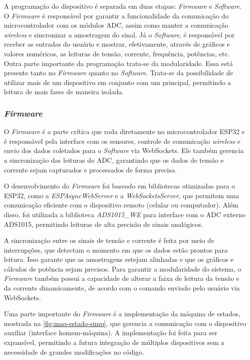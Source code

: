 A programação do dispositivo é separada em duas etapas: \textit{Firmware} e \textit{Software}. O \textit{Firmware} é responsável por garantir a funcionalidade da comunicação do microcontrolador com os módulos \gls{ADC}, assim como manter a comunicação \textit{wireless} e sincronizar a amostragem do sinal.
Já o \textit{Software}, é responsável por receber as entradas do usuário e mostrar, efetivamente, através de gráficos e valores numéricos, as leituras de tensão, corrente, frequência, potências, etc.
Outra parte importante da programação trata-se da modularidade. Essa está presente tanto no \textit{Firmware} quanto no \textit{Software}. Trata-se da possibilidade de utilizar mais de um dispositivo em conjunto com um principal, permitindo a leitura de mais fases de maneira isolada.

\subsubsection{\textit{Firmware}}\label{firmw}

O \textit{Firmware} é a parte crítica que roda diretamente no microcontrolador ESP32 e é responsável pela interface com os sensores, controle de comunicação \textit{wireless} e envio dos dados coletados para o \textit{Software} via WebSockets. Ele também gerencia a sincronização das leituras do ADC, garantindo que os dados de tensão e corrente sejam capturados e processados de forma precisa.

O desenvolvimento do \textit{Firmware} foi baseado em bibliotecas otimizadas para o ESP32, como a \textit{ESPAsyncWebServer} e a \textit{WebSocketsServer}, que permitem uma comunicação eficiente com o dispositivo remoto (celular ou computador). Além disso, foi utilizada a biblioteca \textit{ADS1015\_WE} para interface com o ADC externo ADS1015, permitindo leituras de alta precisão de sinais analógicos.

A sincronização entre os sinais de tensão e corrente é feita por meio de interrupções, que detectam o momento em que os dados estão prontos para leitura. Isso garante que as amostragens estejam alinhadas e que os gráficos e cálculos de potência sejam precisos. Para garantir a modularidade do sistema, o \textit{Firmware} também possui a capacidade de alterar a faixa de leitura da tensão e da corrente dinamicamente, de acordo com o comando enviado pelo usuário via WebSockets.

Uma parte importante do \textit{Firmware} é a implementação da máquina de estados, mostrada na \autoref{fig:maq-estado-simp}, que gerencia a comunicação com o dispositivo auxiliar (interface homem-máquina). A implementação foi feita para ser expansível, permitindo a futura integração de múltiplos dispositivos sem a necessidade de grandes modificações no código.

